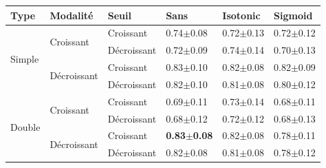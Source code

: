 \begin{table}[H]
    \begin{tabular}{llllll}
        \toprule 
        Type                    & Modalité                          & Seuil             & Sans                  & Isotonic              & Sigmoid               \\ \midrule
        \multirow{4}{*}{Simple} & \multirow{2}{*}{Croissant}        & Croissant         & 0.74$\pm$0.08         & 0.72$\pm$0.13         & 0.72$\pm$0.12         \\ \cline{3-6}
                                &                                   & Décroissant       & 0.72$\pm$0.09         & 0.74$\pm$0.14         & 0.70$\pm$0.13         \\ \cline{2-6}
                                & \multirow{2}{*}{Décroissant}      & Croissant         & 0.83$\pm$0.10         & 0.82$\pm$0.08         & 0.82$\pm$0.09         \\ \cline{3-6}
                                &                                   & Décroissant       & 0.82$\pm$0.10         & 0.81$\pm$0.08         & 0.80$\pm$0.12         \\ \cline{1-6}
        \multirow{4}{*}{Double} & \multirow{2}{*}{Croissant}        & Croissant         & 0.69$\pm$0.11         & 0.73$\pm$0.14         & 0.68$\pm$0.11         \\ \cline{3-6}
                                &                                   & Décroissant       & 0.68$\pm$0.12         & 0.72$\pm$0.12         & 0.68$\pm$0.13         \\ \cline{2-6}
                                & \multirow{2}{*}{Décroissant}      & Croissant         & \textbf{0.83$\pm$0.08}& 0.82$\pm$0.08         & 0.78$\pm$0.11         \\ \cline{3-6}
                                &                                   & Décroissant       & 0.82$\pm$0.08         & 0.81$\pm$0.08         & 0.78$\pm$0.12         \\ \bottomrule
    \end{tabular}
\end{table}

